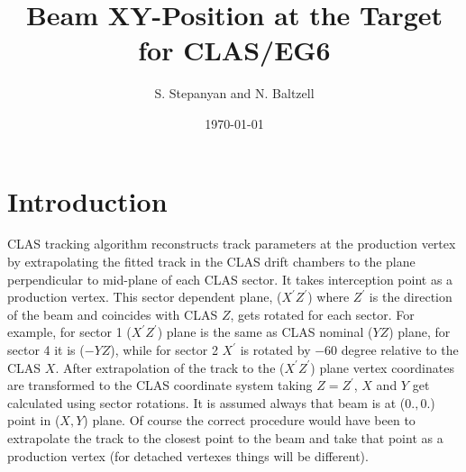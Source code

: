 \documentclass[12pt]{article}
\begin{document}
\title{Beam XY-Position at the Target for CLAS/EG6} 
\author{S. Stepanyan and N. Baltzell}
\date{\today}
\maketitle

\section{Introduction}

CLAS tracking algorithm reconstructs track parameters at the production vertex by extrapolating the fitted track in the CLAS drift chambers to the plane perpendicular to mid-plane of each CLAS sector. It takes interception point as a production vertex. This sector dependent plane, ($X^\prime Z^\prime$) where $Z^\prime$ is the direction of the beam and coincides with CLAS $Z$, gets rotated for each sector. For example, for sector 1 ($X^\prime Z^\prime$) plane is the same as CLAS nominal ($YZ$) plane, for sector 4 it is ($-YZ$), while for sector 2 $X^\prime$ is rotated by $-60$ degree relative to the CLAS $X$. After extrapolation of the track to the ($X^\prime Z^\prime$) plane vertex coordinates are transformed to the CLAS coordinate system taking $Z=Z^\prime$, $X$ and $Y$ get calculated using sector rotations. It is assumed always that beam is at ($0.,0.$) point in ($X,Y$) plane. Of course the correct procedure would have been to extrapolate the track to the closest point to the beam and take that point as a production vertex (for detached vertexes things will be different). 
\end{document}
